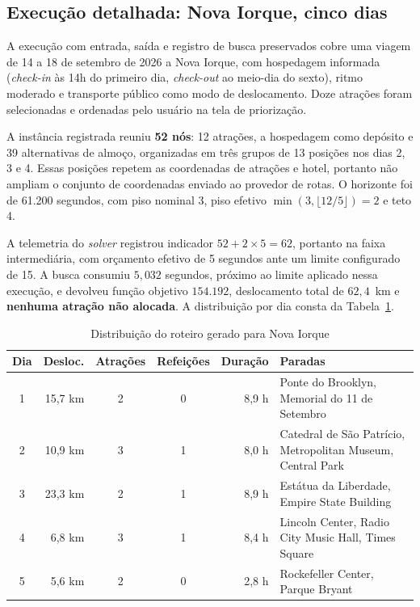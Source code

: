 \subsection{Execução detalhada: Nova Iorque, cinco dias}
\label{sec:execucao-ny}

A execução com entrada, saída e registro de busca preservados cobre uma viagem de 14 a 18 de setembro de 2026 a Nova Iorque, com hospedagem informada (\textit{check-in} às 14h do primeiro dia, \textit{check-out} ao meio-dia do sexto), ritmo moderado e transporte público como modo de deslocamento. Doze atrações foram selecionadas e ordenadas pelo usuário na tela de priorização.

A instância registrada reuniu \textbf{52 nós}: 12 atrações, a hospedagem como depósito e 39 alternativas de almoço, organizadas em três grupos de 13 posições nos dias 2, 3 e 4. Essas posições repetem as coordenadas de atrações e hotel, portanto não ampliam o conjunto de coordenadas enviado ao provedor de rotas. O horizonte foi de 61.200 segundos, com piso nominal 3, piso efetivo $\min(3,\lfloor12/5\rfloor)=2$ e teto 4.

A telemetria do \textit{solver} registrou indicador $52 + 2\times5 = 62$, portanto na faixa intermediária, com orçamento efetivo de 5 segundos ante um limite configurado de 15. A busca consumiu $5{,}032$ segundos, próximo ao limite aplicado nessa execução, e devolveu função objetivo $154.192$, deslocamento total de $62{,}4$~km e \textbf{nenhuma atração não alocada}. A distribuição por dia consta da Tabela~\ref{tab:resultado-ny}.

\begin{table}[H]
\centering
\small
\caption{Distribuição do roteiro gerado para Nova Iorque}
\label{tab:resultado-ny}
\begin{tabularx}{\textwidth}{crccr>{\raggedright\arraybackslash}X}
\hline
\textbf{Dia} & \textbf{Desloc.} & \textbf{Atrações} & \textbf{Refeições} & \textbf{Duração} & \textbf{Paradas} \\
\hline
1 & 15,7 km & 2 & 0 & 8,9 h & Ponte do Brooklyn, Memorial do 11 de Setembro \\
2 & 10,9 km & 3 & 1 & 8,0 h & Catedral de São Patrício, Metropolitan Museum, Central Park \\
3 & 23,3 km & 2 & 1 & 8,9 h & Estátua da Liberdade, Empire State Building \\
4 & \phantom{0}6,8 km & 3 & 1 & 8,4 h & Lincoln Center, Radio City Music Hall, Times Square \\
5 & \phantom{0}5,6 km & 2 & 0 & 2,8 h & Rockefeller Center, Parque Bryant \\
\hline
\end{tabularx}
\end{table}

